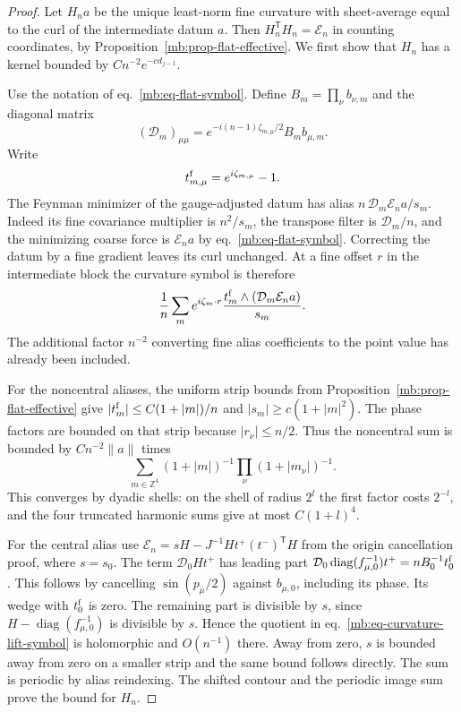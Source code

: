 \documentclass[11pt,letterpaper,reqno]{amsart}
\numberwithin{equation}{section}
\renewcommand{\eqref}[1]{\textup{eq.~\ref{#1}}}
\theoremstyle{definition}
\theoremstyle{remark}
\begin{document}
\begin{proof}
Let \(H_n a\) be the unique least-norm fine curvature with
sheet-average equal to the curl of the intermediate datum
\(a\). Then \(H_n^{\mathsf T}H_n=\mathcal E_n\) in counting
coordinates, by Proposition~\ref{mb:prop-flat-effective}.
We first show that \(H_n\) has a kernel bounded by
\(Cn^{-2}e^{-c d_{j-1}}\).

Use the notation of \eqref{mb:eq-flat-symbol}. Define
\(B_m=\prod_\nu b_{\nu,m}\) and the diagonal matrix
\[
 (\mathcal D_m)_{\mu\mu}
     =e^{-i(n-1)\zeta_{m,\mu}/2}B_m b_{\mu,m}.
\]
Write
\[
 t_{m,\mu}^{\rm f}=e^{i\zeta_{m,\mu}}-1.
\]
The Feynman minimizer of the gauge-adjusted datum has
alias \(n\,\mathcal D_m\mathcal E_n a/s_m\).
Indeed its fine covariance multiplier is \(n^2/s_m\),
the transpose filter is \(\mathcal D_m/n\), and the
minimizing coarse force is \(\mathcal E_n a\) by
\eqref{mb:eq-flat-symbol}. Correcting the datum by a
fine gradient leaves its curl unchanged. At a fine
offset \(r\) in the intermediate block the curvature
symbol is therefore
\begin{equation}\label{mb:eq-curvature-lift-symbol}
 \frac1n\sum_m e^{i\zeta_m\cdot r}
       \frac{t_m^{\rm f}\wedge(\mathcal D_m\mathcal E_n a)}{s_m}.
\end{equation}
The additional factor \(n^{-2}\) converting fine
alias coefficients to the point value has already
been included.

For the noncentral aliases, the uniform strip bounds
from Proposition~\ref{mb:prop-flat-effective} give
\(|t_m^{\rm f}|\le C(1+|m|)/n\) and
\(|s_m|\ge c(1+|m|^2)\).
The phase factors are bounded on that strip because
\(|r_\nu|\le n/2\). Thus the noncentral sum is bounded
by \(Cn^{-2}\|a\|\) times
\[
 \sum_{m\in\mathbb Z^4}(1+|m|)^{-1}
                              \prod_\nu(1+|m_\nu|)^{-1}.
\]
This converges by dyadic shells: on the shell of
radius \(2^l\) the first factor costs \(2^{-l}\), and
the four truncated harmonic sums give at most
\(C(1+l)^4\).

For the central alias use
\(\mathcal E_n=sH-J^{-1}Ht^+(t^-)^{\mathsf T}H\)
from the origin cancellation proof, where \(s=s_0\).
The term \(\mathcal D_0 Ht^+\) has leading part
\(\mathcal D_0\operatorname{diag}(f_{\mu,0}^{-1})t^+
  =nB_0^{-1}t_0^{\rm f}\).
This follows by cancelling \(\sin(p_\mu/2)\) against
\(b_{\mu,0}\), including its phase.
Its wedge with \(t_0^{\rm f}\) is zero. The remaining
part is divisible by \(s\), since
\(H-\operatorname{diag}(f_{\mu,0}^{-1})\) is divisible
by \(s\). Hence the quotient in
\eqref{mb:eq-curvature-lift-symbol} is holomorphic
and \(O(n^{-1})\) there. Away from zero, \(s\)
is bounded away from zero on a smaller strip and
the same bound follows directly. The sum is periodic
by alias reindexing. The shifted contour and the
periodic image sum prove the bound for \(H_n\).


\end{proof}
\end{document}
